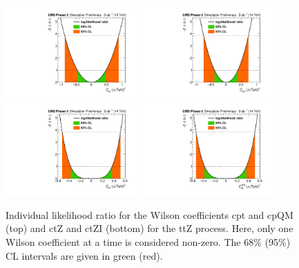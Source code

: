 \documentclass[letterpaper,11pt]{article}
\begin{document}
\begin{figure}[tbp]
  \centering
    \includegraphics[trim={0.4cm 0.cm 0.8cm 0.cm},clip,width=0.45\textwidth]{Figures/1D_cpt_lumi3000_14TeV_CMScombine_r1_fullUnc.pdf}
    \includegraphics[trim={0.4cm 0.cm 0.8cm 0.cm},clip,width=0.45\textwidth]{Figures/1D_cpQM_lumi3000_14TeV_CMScombine_r1_fullUnc.pdf}
    \includegraphics[trim={0.4cm 0.cm 0.8cm 0.cm},clip,width=0.45\textwidth]{Figures/1D_ctZ_lumi3000_14TeV_CMScombine_r1_fullUnc.pdf}
    \includegraphics[trim={0.4cm 0.cm 0.8cm 0.cm},clip,width=0.45\textwidth]{Figures/1D_ctZI_lumi3000_14TeV_CMScombine_r1_fullUnc.pdf}
  \caption{Individual likelihood ratio for the Wilson coefficients cpt and cpQM (top) and ctZ and ctZI (bottom) for the ttZ process.
           Here, only one Wilson coefficient at a time is considered non-zero.
           The 68\% (95\%) CL intervals are given in green (red).
           }
  \label{fig:ttZ_1Dnll}
\end{figure}
\end{document}
